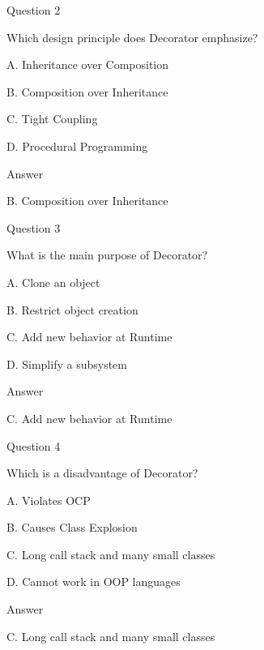 \documentclass[aspectratio=169]{beamer}
\begin{document}
\begin{frame}{Question 2}

Which design principle does Decorator emphasize?

\bigskip

A. Inheritance over Composition

B. Composition over Inheritance

C. Tight Coupling

D. Procedural Programming

\pause

\begin{alertblock}{Answer}

B. Composition over Inheritance

\end{alertblock}

\end{frame}


\begin{frame}{Question 3}

What is the main purpose of Decorator?

\bigskip

A. Clone an object

B. Restrict object creation

C. Add new behavior at Runtime

D. Simplify a subsystem

\pause

\begin{alertblock}{Answer}

C. Add new behavior at Runtime

\end{alertblock}

\end{frame}


\begin{frame}{Question 4}

Which is a disadvantage of Decorator?

\bigskip

A. Violates OCP

B. Causes Class Explosion

C. Long call stack and many small classes

D. Cannot work in OOP languages

\pause

\begin{alertblock}{Answer}

C. Long call stack and many small classes

\end{alertblock}

\end{frame}
\end{document}
